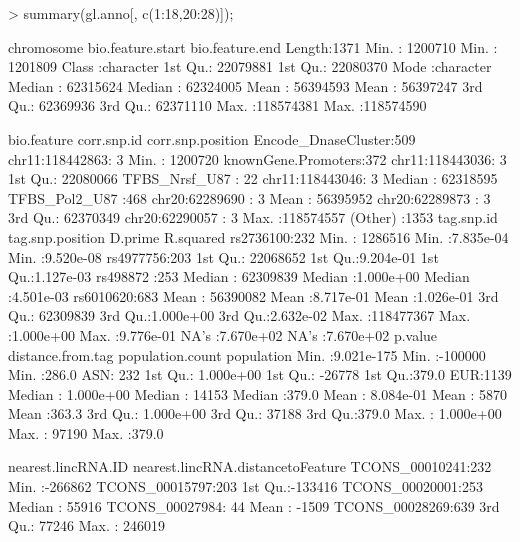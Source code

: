 \documentclass[12pt,fullpage]{article}
\begin{document}
\begin{Schunk}
\begin{Sinput}
> summary(gl.anno[, c(1:18,20:28)]);
\end{Sinput}
\begin{Soutput}
  chromosome        bio.feature.start   bio.feature.end    
 Length:1371        Min.   :  1200710   Min.   :  1201809  
 Class :character   1st Qu.: 22079881   1st Qu.: 22080370  
 Mode  :character   Median : 62315624   Median : 62324005  
                    Mean   : 56394593   Mean   : 56397247  
                    3rd Qu.: 62369936   3rd Qu.: 62371110  
                    Max.   :118574381   Max.   :118574590  
                                                           
              bio.feature           corr.snp.id   corr.snp.position  
 Encode_DnaseCluster:509   chr11:118442863:   3   Min.   :  1200720  
 knownGene.Promoters:372   chr11:118443036:   3   1st Qu.: 22080066  
 TFBS_Nrsf_U87      : 22   chr11:118443046:   3   Median : 62318595  
 TFBS_Pol2_U87      :468   chr20:62289690 :   3   Mean   : 56395952  
                           chr20:62289873 :   3   3rd Qu.: 62370349  
                           chr20:62290057 :   3   Max.   :118574557  
                           (Other)        :1353                      
     tag.snp.id  tag.snp.position       D.prime            R.squared        
 rs2736100:232   Min.   :  1286516   Min.   :7.835e-04   Min.   :9.520e-08  
 rs4977756:203   1st Qu.: 22068652   1st Qu.:9.204e-01   1st Qu.:1.127e-03  
 rs498872 :253   Median : 62309839   Median :1.000e+00   Median :4.501e-03  
 rs6010620:683   Mean   : 56390082   Mean   :8.717e-01   Mean   :1.026e-01  
                 3rd Qu.: 62309839   3rd Qu.:1.000e+00   3rd Qu.:2.632e-02  
                 Max.   :118477367   Max.   :1.000e+00   Max.   :9.776e-01  
                                     NA's   :7.670e+02   NA's   :7.670e+02  
    p.value           distance.from.tag population.count population
 Min.   :9.021e-175   Min.   :-100000   Min.   :286.0    ASN: 232  
 1st Qu.: 1.000e+00   1st Qu.: -26778   1st Qu.:379.0    EUR:1139  
 Median : 1.000e+00   Median :  14153   Median :379.0              
 Mean   : 8.084e-01   Mean   :   5870   Mean   :363.3              
 3rd Qu.: 1.000e+00   3rd Qu.:  37188   3rd Qu.:379.0              
 Max.   : 1.000e+00   Max.   :  97190   Max.   :379.0              
                                                                   
      nearest.lincRNA.ID nearest.lincRNA.distancetoFeature
 TCONS_00010241:232      Min.   :-266862                  
 TCONS_00015797:203      1st Qu.:-133416                  
 TCONS_00020001:253      Median :  55916                  
 TCONS_00027984: 44      Mean   :  -1509                  
 TCONS_00028269:639      3rd Qu.:  77246                  
                         Max.   : 246019                  
                                                          

\end{Soutput}
\end{Schunk}
\end{document}
